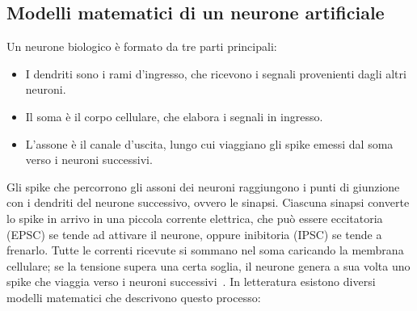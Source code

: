 \subsection{Modelli matematici di un neurone artificiale}
\label{subsec:modelli_neurone}

Un neurone biologico è formato da tre parti principali:
\begin{itemize}
  \item I dendriti sono i rami d'ingresso, che ricevono i segnali provenienti dagli altri neuroni.
  \item Il soma è il corpo cellulare, che elabora i segnali in ingresso.
  \item L'assone è il canale d'uscita, lungo cui viaggiano gli spike emessi dal soma verso i neuroni successivi.
\end{itemize}

Gli spike che percorrono gli assoni dei neuroni raggiungono i punti di giunzione con i dendriti del neurone successivo, ovvero le sinapsi. Ciascuna sinapsi converte lo spike in arrivo in una piccola corrente elettrica, che può essere eccitatoria (EPSC) se tende ad attivare il neurone, oppure inibitoria (IPSC) se tende a frenarlo. Tutte le correnti ricevute si sommano nel soma caricando la membrana cellulare; se la tensione supera una certa soglia, il neurone genera a sua volta uno spike che viaggia verso i neuroni successivi~\cite{indiveri2011}. In letteratura esistono diversi modelli matematici che descrivono questo processo:

